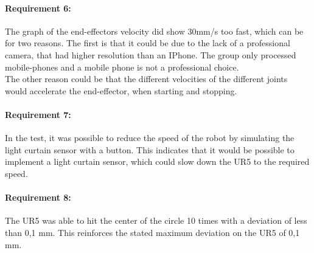 \paragraph{Requirement 6:}
The graph of the end-effectors velocity did show 30mm/s too fast, which can be for  two reasons. The first is that it could be due to the lack of a professional camera, that had higher resolution than an IPhone. The group only processed mobile-phones and a mobile phone is not a professional choice.\\
The other reason could be that the different velocities of the different joints would accelerate the end-effector, when starting and stopping. 


\paragraph{Requirement 7:}
In the test, it was possible to reduce the speed of the robot by simulating the light curtain sensor with a button. This indicates that it would be possible to implement a light curtain sensor, which could slow down the UR5 to the required speed. 


\paragraph{Requirement 8:}
The UR5 was able to hit the center of the circle 10 times with a deviation of less than 0,1 mm. This reinforces the stated maximum deviation on the UR5 of 0,1 mm. 
 

 
